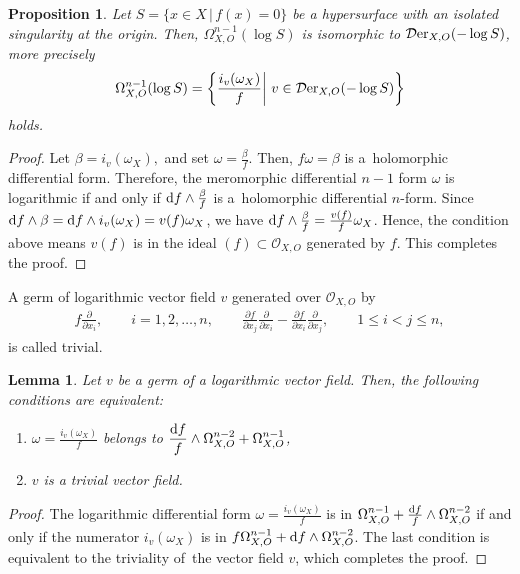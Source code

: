 \documentclass[10pt,a4paper]{amsart}
\numberwithin{equation}{section}
\newtheorem{Lemma}[Theorem]{Lemma}
\newtheorem{Proposition}[Theorem]{Proposition}
 { \theoremstyle{definition}
\newtheorem{Definition}[Theorem]{Definition}
\newtheorem{Remark}[Theorem]{Remark}
\newtheorem{Example}[Theorem]{Example}
 }
\begin{document}
\begin{Proposition}
Let $S=\{x \in X \,|\, f(x) =0\}$ be a hypersurface with an isolated singularity at the origin. Then, $\Omega_{X, O}^{n-1}(\log S)$ is isomorphic to
${\mathcal D}{\rm er}_{X, O}(-\log S)$, more precisely
\begin{gather*}
\Omega_{X, O}^{n-1}(\log S) = \left\{ \frac{i_{v}(\omega_X)}{f} \middle| \ v \in {\mathcal D}{\rm er}_{X, O}(-\log S) \right\}
\end{gather*}
holds.
\end{Proposition}
\begin{proof}
Let $\beta=i_{v}(\omega_X), $ and set $ \omega = \frac{\beta}{f}$. Then, $f\omega = \beta$ is a~holomorphic differential form. Therefore, the meromorphic differential $n-1$ form
$\omega$ is logarithmic if and only if ${\rm d}f\wedge \frac{\beta}{f}$ is a~holo\-morphic differential $n$-form. Since ${\rm d}f\wedge \beta = {\rm d}f\wedge i_{v}(\omega_X) = v(f)\omega_X$, we have ${\rm d}f\wedge \frac{\beta}{f} = \frac{v(f)}{f} \omega_X$. Hence, the condition above means $v(f)$ is in the ideal $(f) \subset {\mathcal O}_{X,O}$ generated by $f$.
This completes the proof.
\end{proof}



A germ of logarithmic vector field $v$ generated over ${\mathcal O}_{X,O}$ by
\begin{gather*}
f\frac{\partial}{\partial x_i}, \qquad
i=1,2,\ldots,n, \qquad
\frac{\partial f}{\partial x_j}\frac{\partial}{\partial x_i} - \frac{\partial f}{\partial x_i}\frac{\partial}{\partial x_j}, \qquad
1 \leq i < j \leq n,
\end{gather*}
is called trivial.

\begin{Lemma}
Let $v$ be a germ of a logarithmic vector field. Then, the following conditions are equivalent:
\begin{enumerate}\itemsep=0pt
\item[$(i)$] $\displaystyle \omega = \frac{i_{v}(\omega_X)}{f}$ belongs to $\displaystyle\frac{{\rm d}f}{f} \wedge \Omega_{X,O}^{n-2}+ \Omega_{X,O}^{n-1}$,
\item[$(ii)$] $v$ is a trivial vector field.
\end{enumerate}
\end{Lemma}
\begin{proof}
The logarithmic differential form $\omega = \frac{i_{v}(\omega_X)}{f}$ is in $\Omega_{X,O}^{n-1}+\frac{{\rm d}f}{f} \wedge \Omega_{X,O}^{n-2}$ if and only if the numerator
$i_{v}(\omega_X)$ is in $f\Omega_{X,O}^{n-1}+ {\rm d}f\wedge \Omega_{X,O}^{n-2}$. The last condition is
equivalent to the triviality of~the vector field $v$, which completes the proof.
\end{proof}
\end{document}
